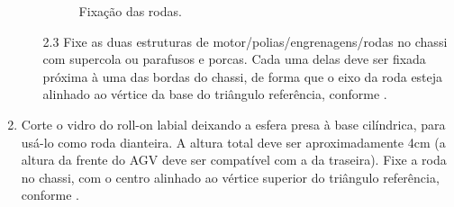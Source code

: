 \documentclass{textolivre}
\begin{document}
\begin{enumerate}
\begin{enumerate}
\begin{figure}[H]
\begin{minipage}{0.31\textwidth}
    \subcaption{}
    \end{minipage}
    \caption{Fixação das rodas.}
    \label{fig03}
    \end{figure}

    \item[2.3] Fixe as duas estruturas de motor/polias/engrenagens/rodas no chassi
    com supercola ou parafusos e porcas. Cada uma delas deve ser fixada próxima à
    uma das bordas do chassi, de forma que o eixo da roda esteja alinhado ao
    vértice da base do triângulo referência, conforme . 

    \end{enumerate}

    \item Corte o vidro do roll-on labial deixando a esfera presa à base
    cilíndrica, para usá-lo como roda dianteira. A altura total deve ser
    aproximadamente 4cm (a altura da frente do AGV deve ser compatível com a da
    traseira). Fixe a roda no chassi, com o centro alinhado ao vértice superior
    do triângulo referência, conforme .


\end{enumerate}
\end{document}
